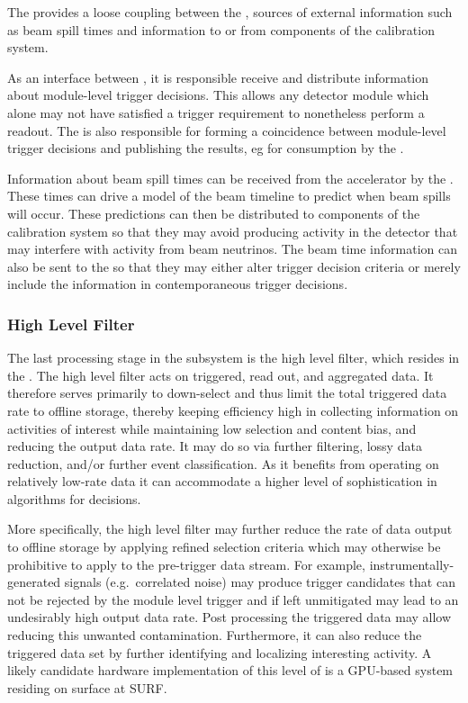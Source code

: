 The  provides a loose coupling between the , sources of external information such as beam spill times and information to or from components of the calibration system. 

As an interface between , it is responsible receive and distribute information about module-level  trigger decisions.
This allows any detector module which alone may not have satisfied a  trigger requirement to nonetheless perform a  readout.
The  is also responsible for forming a coincidence between module-level  trigger decisions and publishing the results, eg for consumption by the .

Information about beam spill times can be received from the accelerator by the . 
These times can drive a model of the beam timeline to predict when beam spills will occur. 
These predictions can then be distributed to components of the calibration system so that they may avoid producing activity in the detector that may interfere with activity from beam neutrinos.
The beam time information can also be sent to the  so that they may either alter trigger decision criteria or merely include the information in contemporaneous trigger decisions.



\subsubsection{High Level Filter}
\label{sec:fd-daq:design-data-reduction}

The last processing stage in the  subsystem is the
high level filter, which resides in the .
The high level filter acts on triggered, read out, and aggregated data. 
It therefore serves primarily to down-select and thus
limit the total triggered data rate to offline storage, thereby keeping 
efficiency high in collecting information on activities of interest
while maintaining low selection and content bias, and reducing the output data
rate. It may do so via 
further filtering, lossy data reduction, and/or further event
classification.
As it benefits from operating on relatively low-rate data it can accommodate a higher level of
sophistication in algorithms for  decisions.

More specifically, the high level filter may further reduce the rate of data output to offline storage by
applying refined selection criteria which may otherwise be prohibitive
to apply to the pre-trigger data stream.  For example, instrumentally-generated signals (e.g.~correlated noise)
may produce trigger candidates that can not be rejected by the module
level trigger and if left unmitigated may lead to an undesirably high
output data rate. 
Post processing the triggered data may allow reducing this unwanted
contamination.
Furthermore, it can also reduce the triggered data set by further identifying
and localizing interesting activity. A likely candidate hardware
implementation of this level of  is a GPU-based system
residing on surface at SURF.

